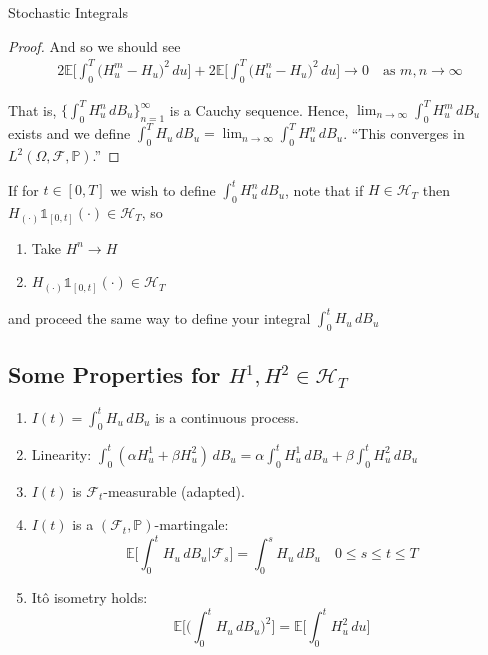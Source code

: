\documentclass[12pt]{article}
\newenvironment{theorem}[2][Theorem:]{\begin{trivlist} %
\item[\hskip \labelsep {\bfseries #1}\hskip \labelsep {\bfseries #2.}]}{\end{trivlist}}
\newlength\tindent
\renewcommand{\indent}{\hspace*{\tindent}}
\begin{document}
\begin{section}{Stochastic Integrals}
\begin{theorem}{We may approximate $H_T$ by a family of simple processes}
\begin{proof}
And so we should see
\begin{align*}
	2\mathbb E\Bigg[\int^T_0 \big(H^m_u - H_u\big)^2\,du\Bigg] + 2\mathbb E\Bigg[\int^T_0 \big(H^n_u - H_u\big)^2\,du\Bigg] \longrightarrow 0 \quad \text{as } m,n \longrightarrow \infty
\end{align*}

\indent That is, $\{\int^T_0 H^n_u\,dB_u\}^\infty_{n = 1}$ is a Cauchy sequence. Hence, $\lim_{n\to\infty}\int^T_0 H^m_u\,dB_u$ exists and we define $\int^T_0 H_u\,dB_u = \lim_{n\to\infty}\int^T_0 H^n_u\,dB_u$. ``This converges in $L^2(\Omega,\mathcal F,\mathbb P)$.''
\end{proof}
\end{theorem}

\indent If for $t \in [0,T]$ we wish to define $\int^t_0 H^n_u\,dB_u$, note that if $H \in \mathcal H_T$ then $H_{(\cdot)}\mathds{1}_{[0,t]}(\cdot) \in \mathcal H_T$, so
\begin{enumerate}
	\item Take $H^n \longrightarrow H$
	\item $H_{(\cdot)}\mathds{1}_{[0,t]}(\cdot) \in \mathcal H_T$
\end{enumerate}
\noindent and proceed the same way to define your integral $\int^t_0 H_u\,dB_u$

\subsection{Some Properties for $H^1,H^2\in \mathcal H_T$}
\begin{enumerate}
	\item $I(t) = \int^t_0 H_u\,dB_u$ is a continuous process.
	\item Linearity: $\int^t_0(\alpha H^1_u + \beta H^2_u)\,dB_u = \alpha\int^t_0 H^1_u\,dB_u + \beta \int^t_0 H^2_u\,dB_u$
	\item $I(t)$ is $\mathcal F_t$-measurable (adapted).
	\item $I(t)$ is a $(\mathcal F_t,\mathbb P)$-martingale:
		\begin{equation*}
			\mathbb E\Bigg[\int^t_0 H_u\,dB_u|\mathcal F_s\Bigg]  = \int^s_0 H_u\,dB_u \quad 0 \leq s \leq t \leq T
		\end{equation*}
	\item It\^{o} isometry holds:
		\begin{equation*}
			\mathbb E\Bigg[\Big(\int^t_0 H_u\,dB_u\Big)^2\Bigg] = \mathbb E\Bigg[\int^t_0 H^2_u\,du\Bigg]
		\end{equation*}
\end{enumerate}


\end{section}
\end{document}
